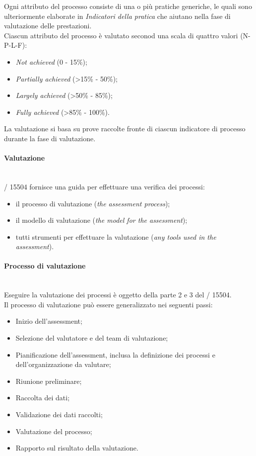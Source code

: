   Ogni attributo del processo consiste di una o più pratiche generiche, le quali sono ulteriormente elaborate in \emph{Indicatori della pratica} che aiutano nella fase di valutazione delle prestazioni.
  \\Ciascun attributo del processo è valutato seconod una scala di quattro valori (N-P-L-F):
  \begin{itemize}
    \item \emph{Not achieved} (0 - 15\%);
    \item \emph{Partially achieved} (>15\% - 50\%);
    \item \emph{Largely achieved} (>50\% - 85\%);
    \item \emph{Fully achieved} (>85\% - 100\%).
  \end{itemize}
  La valutazione si basa su prove raccolte fronte di ciascun indicatore di processo durante la fase di valutazione.\\

  \paragraph{Valutazione}\\
  / 15504 fornisce una guida per effettuare una verifica dei processi:
  \begin{itemize}
    \item il processo di valutazione (\emph{the assessment process});
    \item il modello di valutazione (\emph{the model for the assessment});
    \item tutti strumenti per effettuare la valutazione (\emph{any tools used in the assessment}).
  \end{itemize}
  \paragraph{Processo di valutazione}\\
  Eseguire la valutazione dei processi è oggetto della parte 2 e 3 del / 15504.\\
  Il processo di valutazione può essere generalizzato nei seguenti passi:
  \begin{itemize}
    \item Inizio dell'assessment;
    \item Selezione del valutatore e del team di valutazione;
    \item Pianificazione dell'assessment, inclusa la definizione dei processi e dell'organizzazione da valutare;
    \item Riunione preliminare;
    \item Raccolta dei dati;
    \item Validazione dei dati raccolti;
    \item Valutazione del processo;
    \item Rapporto sul risultato della valutazione.
  \end{itemize}

